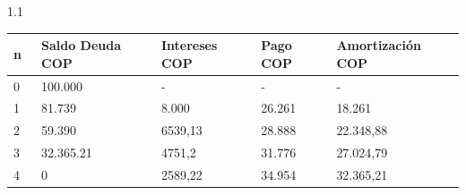 	      \begin{spacing}{1.1}
	      	\begin{center}
	      		\begin{tabular}{|p{1cm}|p{2cm}|p{2.1cm}|p{2cm}|p{3cm}|}
	      			\hline
	      			\rowcolor[HTML]{FFB183}
	      			\textbf{n\ } & \textbf{Saldo Deuda COP} & \textbf{Intereses  COP} & \textbf{Pago COP} & \textbf{Amortización COP } \\ \hline
	      			
	      			0            &   100.000         &      -       &   -    &        -      \\ \hline
	      			1            &   81.739             &   8.000           &   26.261       &   18.261            \\ \hline
	      			2            &   59.390             &   6539,13              &   28.888       &   22.348,88              \\ \hline
	      			3            &   32.365.21            &   4751,2             &   31.776      &   27.024,79              \\ \hline
	      			4            &   0            &   2589,22            &   34.954       &   32.365,21              \\ \hline
	      		\end{tabular}
	      	\end{center}
	      \end{spacing}


